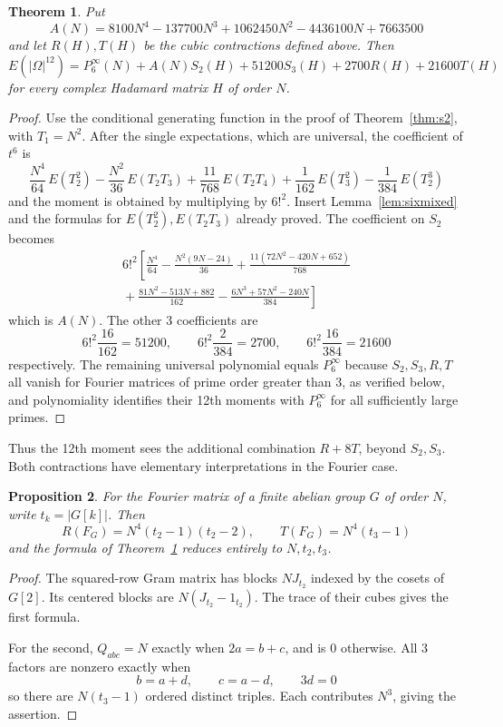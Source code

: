 \documentclass[11pt,a4paper]{article}
\newtheorem{thm}{Theorem}[section]
\newtheorem{prop}[thm]{Proposition}
\theoremstyle{remark}
\begin{document}
\begin{samepage}
\begin{thm}\label{thm:six}
Put
\[
 A(N)=8100N^4-137700N^3+1062450N^2-4436100N+7663500
\]
and let $R(H),T(H)$ be the cubic contractions defined above. Then
\[
 E(|\Omega|^{12})=P^\infty_6(N)+A(N)S_2(H)
                 +51200S_3(H)+2700R(H)+21600T(H)
\]
for every complex Hadamard matrix $H$ of order $N$.
\end{thm}
\end{samepage}
\begin{proof}
Use the conditional generating function in the proof of Theorem~\ref{thm:s2}, with $T_1=N^2$. After the single expectations, which are universal, the coefficient of $t^6$ is
\[
 \frac{N^4}{64}\,E(T_2^2)-\frac{N^2}{36}\,E(T_2T_3)
       +\frac{11}{768}\,E(T_2T_4)
       +\frac1{162}\,E(T_3^2)-\frac1{384}\,E(T_2^3)
\]
and the moment is obtained by multiplying by $6!^2$. Insert Lemma~\ref{lem:sixmixed} and the formulas for $E(T_2^2),E(T_2T_3)$ already proved. The coefficient on $S_2$ becomes
\[
 \begin{gathered}
 6!^2\left[\frac{N^4}{64}-\frac{N^2(9N-24)}{36}
 +\frac{11(72N^2-420N+652)}{768}\right.\\[3pt]
 \left.{}+\frac{81N^2-513N+882}{162}
 -\frac{6N^3+57N^2-240N}{384}\right]
\end{gathered}
\]
which is $A(N)$. The other 3 coefficients are
\[
 6!^2\frac{16}{162}=51200,\qquad
 6!^2\frac{2}{384}=2700,\qquad
 6!^2\frac{16}{384}=21600
\]
respectively. The remaining universal polynomial equals $P^\infty_6$ because $S_2,S_3,R,T$ all vanish for Fourier matrices of prime order greater than 3, as verified below, and polynomiality identifies their 12th moments with $P^\infty_6$ for all sufficiently large primes.
\end{proof}

Thus the 12th moment sees the additional combination $R+8T$, beyond $S_2,S_3$. Both contractions have elementary interpretations in the Fourier case.

\begin{samepage}
\begin{prop}\label{prop:sixfourier}
For the Fourier matrix of a finite abelian group $G$ of order $N$, write $t_k=|G[k]|$. Then
\[
 R(F_G)=N^4(t_2-1)(t_2-2),\qquad
 T(F_G)=N^4(t_3-1)
\]
and the formula of Theorem~\ref{thm:six} reduces entirely to $N,t_2,t_3$.
\end{prop}
\end{samepage}
\begin{proof}
The squared-row Gram matrix has blocks $NJ_{t_2}$ indexed by the cosets of $G[2]$. Its centered blocks are $N(J_{t_2}-1_{t_2})$. The trace of their cubes gives the first formula.

For the second, $Q_{abc}=N$ exactly when $2a=b+c$, and is 0 otherwise. All 3 factors are nonzero exactly when
\[
 b=a+d,\qquad c=a-d,\qquad 3d=0
\]
so there are $N(t_3-1)$ ordered distinct triples. Each contributes $N^3$, giving the assertion.
\end{proof}
\end{document}
